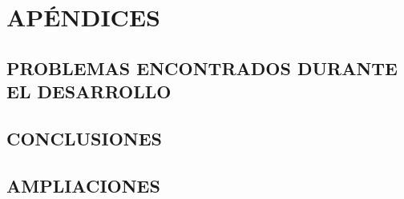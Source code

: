 \newpage
\chapter{APÉNDICES}
\newpage

\section{PROBLEMAS ENCONTRADOS DURANTE EL DESARROLLO}

\newpage
\section{CONCLUSIONES}

\newpage
\section{AMPLIACIONES} 


\nocite{*} %
 


